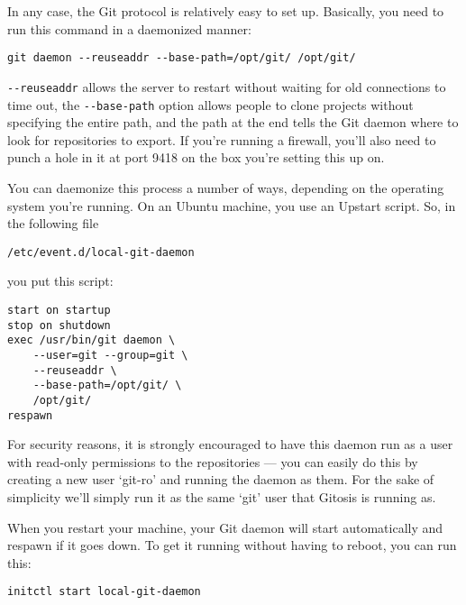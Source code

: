 \documentclass[a4paper]{book}
\begin{document}
In any case, the Git protocol is relatively easy to set up. Basically, you need to run this command in a daemonized manner:

\begin{shaded}\begin{verbatim}
git daemon --reuseaddr --base-path=/opt/git/ /opt/git/
\end{verbatim}\end{shaded}

\texttt{-{}-reuseaddr} allows the server to restart without waiting for old connections to time out, the \texttt{-{}-base-path} option allows people to clone projects without specifying the entire path, and the path at the end tells the Git daemon where to look for repositories to export. If you're running a firewall, you'll also need to punch a hole in it at port 9418 on the box you're setting this up on.

You can daemonize this process a number of ways, depending on the operating system you're running. On an Ubuntu machine, you use an Upstart script. So, in the following file

\begin{shaded}\begin{verbatim}
/etc/event.d/local-git-daemon
\end{verbatim}\end{shaded}

you put this script:

\begin{shaded}\begin{verbatim}
start on startup
stop on shutdown
exec /usr/bin/git daemon \
    --user=git --group=git \
    --reuseaddr \
    --base-path=/opt/git/ \
    /opt/git/
respawn
\end{verbatim}\end{shaded}

For security reasons, it is strongly encouraged to have this daemon run as a user with read-only permissions to the repositories --- you can easily do this by creating a new user `git-ro' and running the daemon as them. For the sake of simplicity we'll simply run it as the same `git' user that Gitosis is running as.

When you restart your machine, your Git daemon will start automatically and respawn if it goes down. To get it running without having to reboot, you can run this:

\begin{shaded}\begin{verbatim}
initctl start local-git-daemon
\end{verbatim}\end{shaded}
\end{document}
